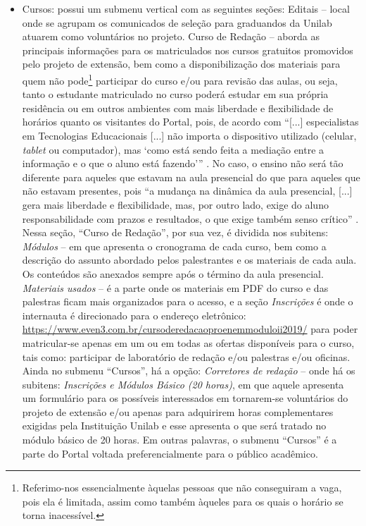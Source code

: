 \documentclass{textolivre}
\begin{document}
\begin{itemize}
\item Cursos: possui um submenu vertical com as seguintes seções: Editais – local onde se agrupam os comunicados de seleção para graduandos da Unilab atuarem como voluntários no projeto. Curso de Redação – aborda as principais informações para os matriculados nos cursos gratuitos promovidos pelo projeto de extensão, bem como a disponibilização dos materiais para quem não pode\footnote{Referimo-nos essencialmente àquelas pessoas que não conseguiram a vaga, pois ela é limitada, assim como também àqueles para os quais o horário se torna inacessível.} participar do curso e/ou para revisão das aulas, ou seja, tanto o estudante matriculado no curso poderá estudar em sua própria residência ou em outros ambientes com mais liberdade e flexibilidade de horários quanto os visitantes do Portal, pois, de acordo com “[...] especialistas em Tecnologias Educacionais [...] não importa o dispositivo utilizado (celular, \emph{tablet} ou computador), mas ‘como está sendo feita a mediação entre a informação e o que o aluno está fazendo’” \cite[p. 153]{meirelles2017}. No caso, o ensino não será tão diferente para aqueles que estavam na aula presencial do que para aqueles que não estavam presentes, pois “a mudança na dinâmica da aula presencial, [...] gera mais liberdade e flexibilidade, mas, por outro lado, exige do aluno responsabilidade com prazos e resultados, o que exige também senso crítico” \cite[p. 162]{meirelles2017}. Nessa seção, “Curso de Redação”, por sua vez, é dividida nos subitens: \emph{Módulos} – em que apresenta o cronograma de cada curso, bem como a descrição do assunto abordado pelos palestrantes e os materiais de cada aula. Os conteúdos são anexados sempre após o término da aula presencial. \emph{Materiais usados} – é a parte onde os materiais em PDF do curso e das palestras ficam mais organizados para o acesso, e a seção \emph{Inscrições} é onde o internauta é direcionado para o endereço eletrônico: \url{https://www.even3.com.br/cursoderedacaoproenemmoduloii2019/} para poder matricular-se apenas em um ou em todas as ofertas disponíveis para o curso, tais como: participar de laboratório de redação e/ou palestras e/ou oficinas. Ainda no submenu “Cursos”, há a opção: \emph{Corretores de redação} – onde há os subitens: \emph{Inscrições e Módulos Básico (20 horas)}, em que aquele apresenta um formulário para os possíveis interessados em tornarem-se voluntários do projeto de extensão e/ou apenas para adquirirem horas complementares exigidas pela Instituição Unilab e esse apresenta o que será tratado no módulo básico de 20 horas. Em outras palavras, o submenu “Cursos” é a parte do Portal voltada preferencialmente para o público acadêmico.
\end{itemize}
\end{document}
